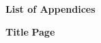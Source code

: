 \begin{titlepage}

    \begin{center}
        {\fontsize{14}{18}\selectfont \textbf{List of Appendices}}
    \end{center}

    \vspace*{48pt} 

    \noindent
    {\fontsize{12}{14}\selectfont \textbf{Title}} \hfill {\fontsize{12}{14}\selectfont \textbf{Page}} \\[12pt] %

    {\fontsize{12}{18}\selectfont
    \makeatletter
    \newcommand{\cftapplineleader}{\cftdotfill{\cftdotsep}}
    \renewcommand{\@pnumwidth}{1.55em}
    \renewcommand{\@tocrmarg}{2.55em}
    
    \makeatother
    }

\end{titlepage}

